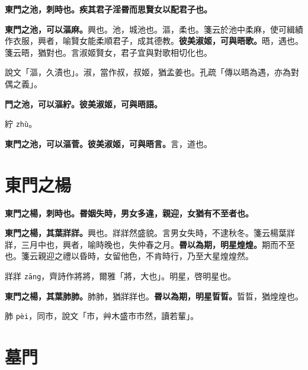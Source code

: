 
\textbf{東門之池，刺時也。疾其君子淫昬而思賢女以配君子也。}

\textbf{東門之池，可以漚麻。}{\footnotesize 興也。池，城池也。漚，柔也。箋云於池中柔麻，使可緝績作衣服，興者，喻賢女能柔順君子，成其德教。}\textbf{彼美淑姬，可與晤歌。}{\footnotesize 晤，遇也。箋云晤，猶對也。言淑姬賢女，君子宜與對歌相切化也。}

\begin{quoting}說文「漚，久漬也」。淑，當作叔，叔姬，猶孟姜也。孔疏「傳以晤為遇，亦為對偶之義」。\end{quoting}

\textbf{門之池，可以漚紵。彼美淑姬，可與晤語。}

\begin{quoting}紵 \texttt{zhù}。\end{quoting}

\textbf{東門之池，可以漚菅。彼美淑姬，可與晤言。}{\footnotesize 言，道也。}

\section{東門之楊}


\textbf{東門之楊，刺時也。昬姻失時，男女多違，親迎，女猶有不至者也。}

\textbf{東門之楊，其葉牂牂。}{\footnotesize 興也。牂牂然盛貌。言男女失時，不逮秋冬。箋云楊葉牂牂，三月中也，興者，喻時晚也，失仲春之月。}\textbf{昬以為期，明星煌煌。}{\footnotesize 期而不至也。箋云親迎之禮以昏時，女留他色，不肯時行，乃至大星煌煌然。}

\begin{quoting}牂牂 \texttt{zāng}，齊詩作將將，爾雅「將，大也」。明星，啓明星也。\end{quoting}

\textbf{東門之楊，其葉肺肺。}{\footnotesize 肺肺，猶牂牂也。}\textbf{昬以為期，明星晢晢。}{\footnotesize 晢晢，猶煌煌也。}

\begin{quoting}肺 \texttt{pèi}，同巿，說文「巿，艸木盛巿巿然，讀若輩」。\end{quoting}

\section{墓門}


